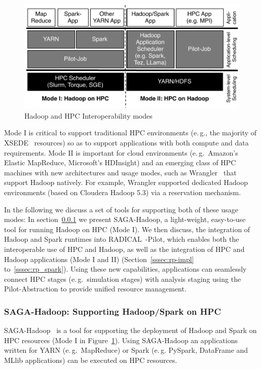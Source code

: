 \begin{figure}[t]
    \centering
    \includegraphics[width=.95\textwidth]{figures/data_analytics_hpc/hpc_hadoop/hadoop-on-hpc-viceverse.pdf}
    \caption{Hadoop and HPC Interoperability modes\label{fig:figures_hadoop-on-hpc-viceverse}}
\end{figure}

Mode I is critical to support traditional HPC environments (e.\,g., the majority of XSEDE~\cite{xsede} resources) so as to support applications with both compute and data requirements.
Mode II is important for cloud environments (e.\,g.\ Amazon's Elastic MapReduce, Microsoft's HDInsight) and an emerging class of HPC machines with new architectures and usage modes, such as Wrangler~\cite{wrangler} that support Hadoop natively.
For example, Wrangler supported dedicated Hadoop environments (based on Cloudera Hadoop 5.3) via a reservation mechanism.

In the following we discuss a set of tools for supporting both of these usage modes:
In section~\ref{sssec:saga_hadoop} we present SAGA-Hadoop, a light-weight, easy-to-use tool for running Hadoop on HPC (Mode I).
We then discuss, the integration of Hadoop and Spark runtimes into RADICAL~-Pilot, which enables both the interoperable use of HPC and Hadoop, as well as the integration of HPC and Hadoop applications (Mode I and II) (Section~\ref{sssec:rp-impl} to~\ref{sssec:rp_spark}).
Using these new capabilities, applications can seamlessly connect HPC stages (e.\,g.\ simulation stages) with analysis staging using the Pilot-Abstraction to provide unified resource management.

\subsubsection{SAGA-Hadoop: Supporting Hadoop/Spark on HPC}
\label{sssec:saga_hadoop}

SAGA-Hadoop~\cite{saga-hadoop} is a tool for supporting the deployment of Hadoop and Spark on HPC resources (Mode I in Figure~\ref{fig:figures_hadoop-on-hpc-viceverse}).
Using SAGA-Hadoop an applications written for YARN (e.\,g.\ MapReduce) or Spark (e.\,g. PySpark, DataFrame and MLlib applications) can be executed on HPC resources.

